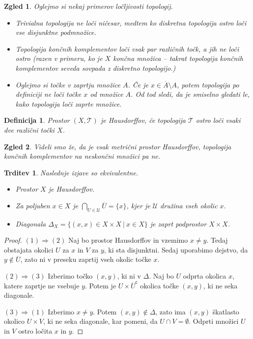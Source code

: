\documentclass[10pt, a4paper]{article}
\newtheorem{trditev}[izr]{Trditev}
\newtheorem{defi}{Definicija}[section]
\newenvironment{noticeB}{%
  \tcolorbox[%
  notitle,
  empty,
  enhanced,  %
  breakable,
  coltext=black,
  colback=white, 
  fontupper=\rmfamily,
  parbox=false,
  noparskip,
  sharp corners,
  boxrule=-1pt,  %
  frame hidden,
  left=7pt,  %
  right=7pt,
  top=5pt,
  bottom=5pt,
  before skip=2.5ex plus 2pt,
  after skip=2.5ex plus 2pt,
  borderline west = {1.5pt}{-0.1pt}{blue!30!black}, %
  overlay unbroken and last={%
    \draw[color=black, line width=1.25pt]
    ($(frame.south west)+(1.pt, -0.1pt)$) -- ++(2em, 0);
  }
  ]}
{\endtcolorbox}
\newenvironment{definicija}{\begin{defi}\begin{noticeB}}{%
    \end{noticeB}\end{defi}}
\newtheorem{zgled}{Zgled}[section]
\newenvironment{noticeC}{%
  \tcolorbox[%
  notitle,
  empty,
  enhanced,  %
  breakable,
  coltext=black, 
  fontupper=\rmfamily,
  parbox=false,
  noparskip,
  sharp corners,
  boxrule=-1pt,  %
  frame hidden,
  left=7pt,  %
  right=7pt,
  top=5pt,
  bottom=5pt,
  before skip=2.5ex plus 2pt,
  after skip=2.5ex plus 2pt,
  overlay unbroken and last={%
  },
  ]}
{\endtcolorbox}
\newenvironment{dokaz}%
  {\begin{noticeC}\begin{proof}}%
  {\end{proof}\end{noticeC}}
\newcommand{\stcomp}[1]{{#1}^{\mathsf{c}}}
\newcommand{\topo}[1]{\mathcal{#1}}
\begin{document}
\begin{zgled}
  Oglejmo si nekaj primerov ločljivosti topologij.
  \begin{itemize}
    \item Trivialna topologija ne loči ničesar, medtem ko diskretna topologija ostro loči vse disjunktne podmnožice.
    \item Topologija končnih komplementov loči vsak par različnih točk, a jih ne loči ostro 
    (razen v primeru, ko je $X$ končna množica -- takrat topologija končnih komplementov seveda sovpada z diskretno topologijo.)
    \item Oglejmo si točke v zaprtju množice $A$. Če je $x \in \overline{A} \setminus A$,
    potem topologija po definiciji ne loči točke $x$ od množice $A$.
    Od tod sledi, da je smiselno gledati le, kako topologija loči zaprte množice.
  \end{itemize}
\end{zgled}

\begin{definicija}
  Prostor $(X, \topo{T})$ je Hausdorffov, če topologija $\topo{T}$ 
  ostro loči vsaki dve različni točki $X$.
\end{definicija}

\begin{zgled}
  Videli smo že, da je vsak metrični prostor Hausdorffov, topologija končnih 
  komplementov na neskončni množici pa ne.
\end{zgled}

\begin{trditev}
  Naslednje izjave so ekvivalentne.
  \begin{itemize}
    \item Prostor $X$ je Hausdorffov.
    \item Za poljuben $x \in X$ je $\displaystyle \bigcap_{U \in \mathcal{U}} \overline{U} = \{x\}$, kjer je $\mathcal{U}$ družina vseh okolic $x$.
    \item Diagonala $\Delta_X = \{(x, x) \in X \times X\ |\ x \in X\}$ je zaprt podprostor $X \times X$.
  \end{itemize}
\end{trditev}

\begin{dokaz}
  $(1) \Rightarrow (2)$ Naj bo prostor Hausdorffov in vzemimo $x \neq y$.
  Tedaj obstajata okolici $U$ za $x$ in $V$ za $y$, ki sta disjunktni.
  Sedaj uporabimo dejstvo, da $y \notin \overline{U}$, zato ni v preseku zaprtij vseh okolic točke $x$.

  $(2) \Rightarrow (3)$ Izberimo točko $(x, y)$, ki ni v $\Delta$.
  Naj bo $U$ odprta okolica $x$, katere zaprtje ne vsebuje $y$.
  Potem je $U \times \stcomp{\overline{U}}$ okolica točke $(x, y)$, ki ne seka diagonale.

  $(3) \Rightarrow (1)$ Izberimo $x \neq y$. Potem $(x, y) \notin \Delta$, zato ima 
  $(x, y)$ škatlasto okolico $U \times V$, ki ne seka diagonale, kar pomeni, 
  da $U \cap V = \emptyset$. Odprti množici $U$ in $V$ ostro ločita $x$ in $y$.
\end{dokaz}
\end{document}

